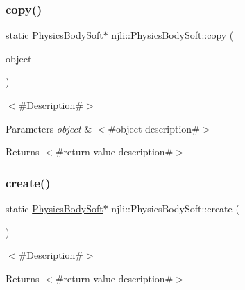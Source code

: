 \subsubsection{\texorpdfstring{copy()}{copy()}}
{\footnotesize\ttfamily static \mbox{\hyperlink{classnjli_1_1_physics_body_soft}{Physics\+Body\+Soft}}$\ast$ njli\+::\+Physics\+Body\+Soft\+::copy (\begin{DoxyParamCaption}\item[{const \mbox{\hyperlink{classnjli_1_1_physics_body_soft}{Physics\+Body\+Soft}} \&}]{object }\end{DoxyParamCaption})\hspace{0.3cm}{\ttfamily [static]}}

$<$\#\+Description\#$>$


\begin{DoxyParams}{Parameters}
{\em object} & $<$\#object description\#$>$\\
\hline
\end{DoxyParams}
\begin{DoxyReturn}{Returns}
$<$\#return value description\#$>$ 
\end{DoxyReturn}
\mbox{\label{classnjli_1_1_physics_body_soft_a198d97f667d97209f031539d5f885cfb}} 
\subsubsection{\texorpdfstring{create()}{create()}\hspace{0.1cm}{\footnotesize\ttfamily [1/2]}}
{\footnotesize\ttfamily static \mbox{\hyperlink{classnjli_1_1_physics_body_soft}{Physics\+Body\+Soft}}$\ast$ njli\+::\+Physics\+Body\+Soft\+::create (\begin{DoxyParamCaption}{ }\end{DoxyParamCaption})\hspace{0.3cm}{\ttfamily [static]}}

$<$\#\+Description\#$>$

\begin{DoxyReturn}{Returns}
$<$\#return value description\#$>$ 
\end{DoxyReturn}
\mbox{\label{classnjli_1_1_physics_body_soft_a31d96acaf729965ab5784ec230ccf6cf}} 
